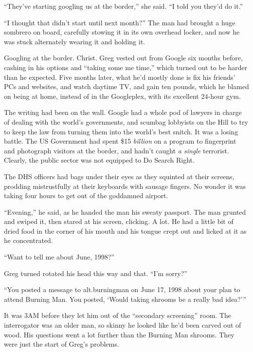 “They've starting googling us at the border,” she said. “I told 
you they'd do it.”

“I thought that didn't start until next month?” The man had brought 
a huge sombrero on board, carefully stowing it in its own overhead 
locker, and now he was stuck alternately wearing it and holding it.

Googling at the border. Christ. Greg vested out from Google six months 
before, cashing in his options and “taking some me time,” which 
turned out to be harder than he expected. Five months later, what he'd 
mostly done is fix his friends' PCs and websites, and watch daytime TV, 
and gain ten pounds, which he blamed on being at home, instead of in 
the Googleplex, with its excellent 24-hour gym.

The writing had been on the wall. Google had a whole pod of lawyers in 
charge of dealing with the world's governments, and scumbag lobbyists 
on the Hill to try to keep the law from turning them into the world's 
best snitch. It was a losing battle. The US Government had spent \$15 
\emph{billion} on a program to fingerprint and photograph visitors at 
the border, and hadn't caught \emph{a single} terrorist. Clearly, the 
public sector was not equipped to Do Search Right.

The DHS officers had bags under their eyes as they squinted at their 
screens, prodding mistrustfully at their keyboards with sausage 
fingers. No wonder it was taking four hours to get out of the goddamned 
airport.

“Evening,” he said, as he handed the man his sweaty passport. The 
man grunted and swiped it, then stared at his screen, clicking. A lot. 
He had a little bit of dried food in the corner of his mouth and his 
tongue crept out and licked at it as he concentrated.

“Want to tell me about June, 1998?”

Greg turned rotated his head this way and that. “I'm sorry?”

“You posted a message to alt.burningman on June 17, 1998 about your 
plan to attend Burning Man. You posted, `Would taking shrooms be a 
really bad idea?'”

\tb

It was 3AM before they let him out of the “secondary screening” 
room. The interrogator was an older man, so skinny he looked like he'd 
been carved out of wood. His questions went a lot further than the 
Burning Man shrooms. They were just the start of Greg's problems.

